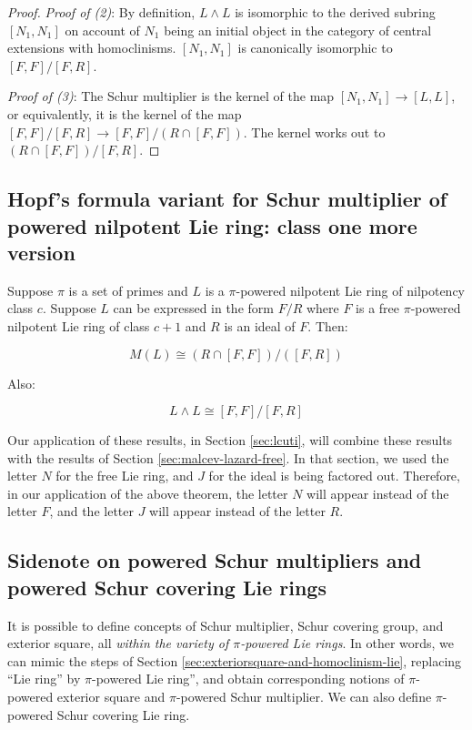 \begin{proof}
  {\em Proof of (2)}: By definition, $L \wedge L$ is isomorphic to the
  derived subring $[N_1,N_1]$ on account of $N_1$ being an initial
  object in the category of central extensions with
  homoclinisms. $[N_1,N_1]$ is canonically isomorphic to
  $[F,F]/[F,R]$.

  {\em Proof of (3)}: The Schur multiplier is the kernel of the map
  $[N_1,N_1] \to [L,L]$, or equivalently, it is the kernel of the map
  $[F,F]/[F,R] \to [F,F]/(R \cap [F,F])$. The kernel works out to $(R
  \cap [F,F])/[F,R]$.
\end{proof}

\subsection{Hopf's formula variant for Schur multiplier of powered nilpotent Lie ring: class one more version}\label{sec:hopf-formula-pi-powered-class-one-more-lie}

Suppose $\pi$ is a set of primes and $L$ is a $\pi$-powered nilpotent
Lie ring of nilpotency class $c$. Suppose $L$ can be expressed in the
form $F/R$ where $F$ is a free $\pi$-powered nilpotent Lie ring of class
$c + 1$ and $R$ is an ideal of $F$. Then:

\begin{equation}\label{eq:pi-powered-hopf-formula-class-one-more-lie}
  M(L) \cong (R \cap [F,F])/([F,R])
\end{equation}

Also:

\begin{equation}\label{eq:pi-powered-exteriorsquare-hopf-formula-class-one-more-lie}
  L \wedge L \cong [F,F]/[F,R]
\end{equation}

Our application of these results, in Section \ref{sec:lcuti}, will
combine these results with the results of Section
\ref{sec:malcev-lazard-free}. In that section, we used the letter $N$
for the free Lie ring, and $J$ for the ideal is being factored
out. Therefore, in our application of the above theorem, the letter
$N$ will appear instead of the letter $F$, and the letter $J$ will
appear instead of the letter $R$.

\subsection{Sidenote on powered Schur multipliers and powered Schur covering Lie rings}

It is possible to define concepts of Schur multiplier, Schur covering
group, and exterior square, all {\em within the variety of
  $\pi$-powered Lie rings}. In other words, we can mimic the steps of
Section \ref{sec:exteriorsquare-and-homoclinism-lie}, replacing ``Lie
ring'' by $\pi$-powered Lie ring'', and obtain corresponding notions
of $\pi$-powered exterior square and $\pi$-powered Schur
multiplier. We can also define $\pi$-powered Schur covering Lie ring.

